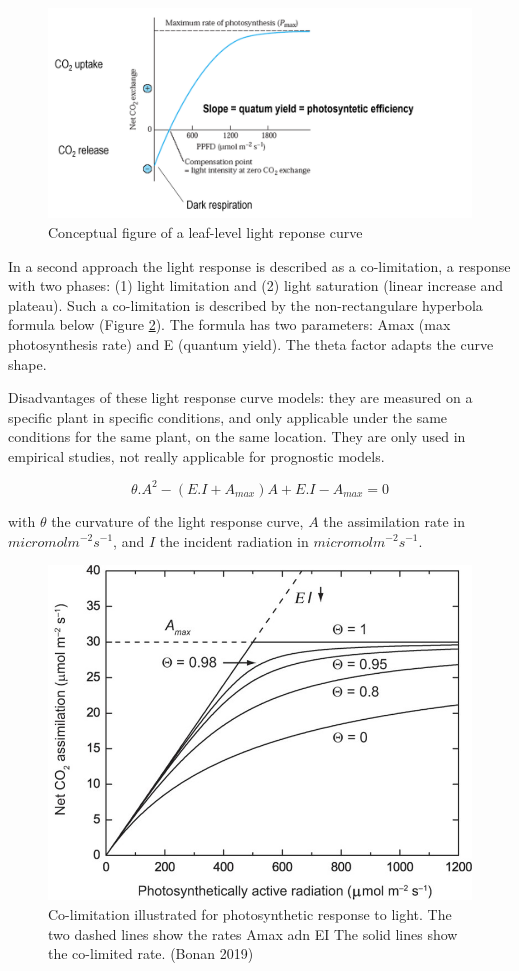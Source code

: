 \documentclass[
  12pt,
  oneside]{book}
\begin{document}
\begin{figure}

{\centering \includegraphics[width=0.8\linewidth]{figures/chap2/LRC} 

}

\caption{Conceptual figure of a leaf-level light reponse curve}\label{fig:f24}
\end{figure}

In a second approach the light response is described as a co-limitation, a response with two phases: (1) light limitation and (2) light saturation (linear increase and plateau). Such a co-limitation is described by the non-rectangulare hyperbola formula below (Figure \ref{fig:f25}). The formula has two parameters: Amax (max photosynthesis rate) and E (quantum yield). The theta factor adapts the curve shape.

Disadvantages of these light response curve models: they are measured on a specific plant in specific conditions, and only applicable under the same conditions for the same plant, on the same location. They are only used in empirical studies, not really applicable for prognostic models.

\[
\theta.A^2-(E.I+A_{max})A+E.I-A_{max}=0
\]

with \(\theta\) the curvature of the light response curve, \(A\) the assimilation rate in \(micromol m^{-2} s^{-1}\), and \(I\) the incident radiation in \(micromol m^{-2} s^{-1}\).

\begin{figure}

{\centering \includegraphics[width=0.8\linewidth]{figures/chap2/hyperbola} 

}

\caption{Co-limitation illustrated for photosynthetic response to light. The two dashed lines show the rates Amax adn EI The solid lines show the co-limited rate. (Bonan 2019)}\label{fig:f25}
\end{figure}
\end{document}
